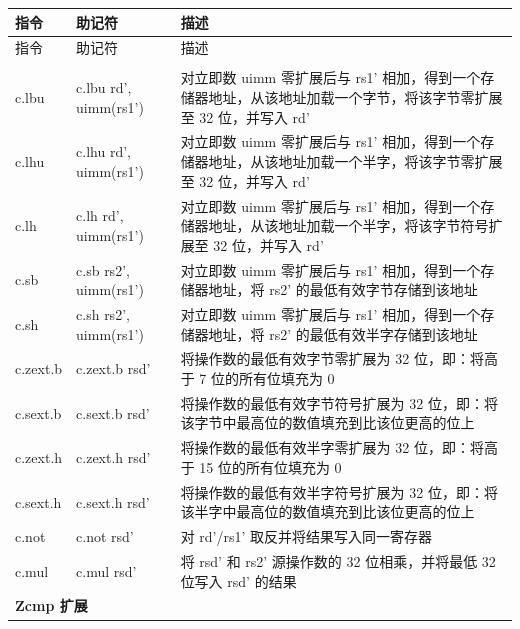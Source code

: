 \documentclass[main\_\_CN.tex]{subfiles}
\begin{document}
\begin{longtable}{ | p{2.0cm} | p{4.0cm} |  p{10.0cm} | }
\hline\rowcolor{lightgray}
指令 & 助记符 & 描述  \\ \hline
\endfirsthead
\hline
\rowcolor{lightgray}
指令 & 助记符 & 描述  \\ \hline
\hline
\endhead
\endfoot

\multicolumn{3}{|l|}{\textbf{Zcb 扩展}} \\\hline
c.lbu & c.lbu rd', uimm(rs1') & 对立即数 uimm 零扩展后与 rs1' 相加，得到一个存储器地址，从该地址加载一个字节，将该字节零扩展至 32 位，并写入 rd' \\\hline
c.lhu & c.lhu rd', uimm(rs1') &  对立即数 uimm 零扩展后与 rs1' 相加，得到一个存储器地址，从该地址加载一个半字，将该字节零扩展至 32 位，并写入 rd'\\\hline
c.lh & c.lh rd', uimm(rs1') & 对立即数 uimm 零扩展后与 rs1' 相加，得到一个存储器地址，从该地址加载一个半字，将该字节符号扩展至 32 位，并写入 rd' \\\hline
c.sb & c.sb rs2', uimm(rs1') & 对立即数 uimm 零扩展后与 rs1' 相加，得到一个存储器地址，将 rs2' 的最低有效字节存储到该地址 \\\hline
c.sh & c.sh rs2', uimm(rs1') &  对立即数 uimm 零扩展后与 rs1' 相加，得到一个存储器地址，将 rs2' 的最低有效半字存储到该地址  \\\hline
c.zext.b & c.zext.b rsd' & 将操作数的最低有效字节零扩展为 32 位，即：将高于 7 位的所有位填充为 0 \\\hline
c.sext.b & c.sext.b rsd' & 将操作数的最低有效字节符号扩展为 32 位，即：将该字节中最高位的数值填充到比该位更高的位上  \\\hline
c.zext.h & c.zext.h rsd' &  将操作数的最低有效半字零扩展为 32 位，即：将高于 15 位的所有位填充为 0 \\\hline
c.sext.h  & c.sext.h rsd'  &  将操作数的最低有效半字符号扩展为 32 位，即：将该半字中最高位的数值填充到比该位更高的位上 \\\hline
c.not & c.not rsd' & 对 rd'/rs1' 取反并将结果写入同一寄存器 \\\hline
c.mul & c.mul rsd' & 将 rsd' 和 rs2' 源操作数的 32 位相乘，并将最低 32 位写入 rsd' 的结果 \\\hline

\multicolumn{3}{|l|}{\textbf{Zcmp 扩展}} \\\hline


\end{longtable}
\end{document}
